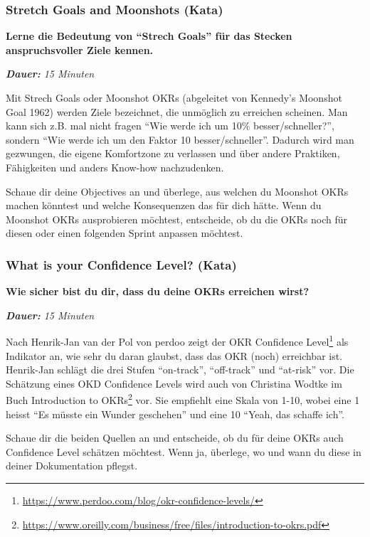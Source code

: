 \documentclass[
  ngerman,
  paper=a4,
,captions=tableheading
]{scrartcl}
\DeclareRobustCommand{\href}[2]{#2\footnote{\url{#1}}}
\begin{document}
\hypertarget{stretch-goals-and-moonshots-kata}{%
\subsubsection{Stretch Goals and Moonshots
(Kata)}\label{stretch-goals-and-moonshots-kata}}

\textbf{Lerne die Bedeutung von ``Strech Goals'' für das Stecken
anspruchsvoller Ziele kennen.}

\emph{\textbf{Dauer:} 15 Minuten}

Mit Strech Goals oder Moonshot OKRs (abgeleitet von Kennedy's Moonshot
Goal 1962) werden Ziele bezeichnet, die unmöglich zu erreichen scheinen.
Man kann sich z.B. mal nicht fragen ``Wie werde ich um 10\%
besser/schneller?'', sondern ``Wie werde ich um den Faktor 10
besser/schneller''. Dadurch wird man gezwungen, die eigene Komfortzone
zu verlassen und über andere Praktiken, Fähigkeiten und anders Know-how
nachzudenken.

Schaue dir deine Objectives an und überlege, aus welchen du Moonshot
OKRs machen könntest und welche Konsequenzen das für dich hätte. Wenn du
Moonshot OKRs ausprobieren möchtest, entscheide, ob du die OKRs noch für
diesen oder einen folgenden Sprint anpassen möchtest.

\hypertarget{what-is-your-confidence-level-kata}{%
\subsubsection{What is your Confidence Level?
(Kata)}\label{what-is-your-confidence-level-kata}}

\textbf{Wie sicher bist du dir, dass du deine OKRs erreichen wirst?}

\emph{\textbf{Dauer:} 15 Minuten}

Nach Henrik-Jan van der Pol von perdoo zeigt der
\href{https://www.perdoo.com/blog/okr-confidence-levels/}{OKR Confidence
Level} als Indikator an, wie sehr du daran glaubst, dass das OKR (noch)
erreichbar ist. Henrik-Jan schlägt die drei Stufen ``on-track'',
``off-track'' und ``at-risk'' vor. Die Schätzung eines OKD Confidence
Levels wird auch von Christina Wodtke im Buch
\href{https://www.oreilly.com/business/free/files/introduction-to-okrs.pdf}{Introduction
to OKRs} vor. Sie empfiehlt eine Skala von 1-10, wobei eine 1 heisst
``Es müsste ein Wunder geschehen'' und eine 10 ``Yeah, das schaffe
ich''.

Schaue dir die beiden Quellen an und entscheide, ob du für deine OKRs
auch Confidence Level schätzen möchtest. Wenn ja, überlege, wo und wann
du diese in deiner Dokumentation pflegst.
\end{document}
